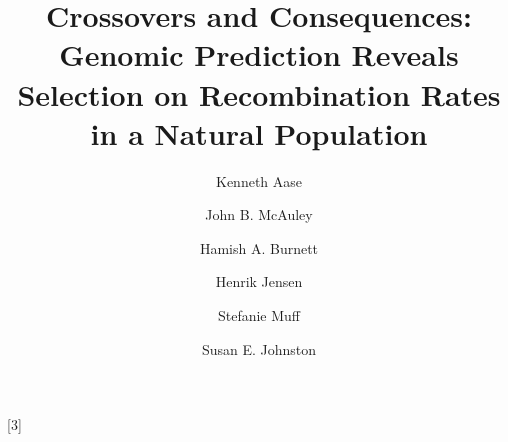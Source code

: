 \usepackage[utf8]{inputenc}
\usepackage[english]{babel}
\usepackage[doublespacing]{setspace}
\usepackage[mathlines]{lineno}
\usepackage{minted}
\usepackage{numprint}
\usepackage{csquotes,xpatch}
\usepackage{fancyhdr,lipsum}
\usepackage{amsmath}
\usepackage{amsfonts}
\usepackage[T1]{fontenc}
\usepackage{lmodern}
\usepackage[normalem]{ulem}
\usepackage[color=blue!30!white,textsize=small,textwidth=30mm]{todonotes}
\usepackage[left=2cm,top=2cm,right=3.5cm,bottom=2cm,bindingoffset=0.5cm]{geometry}
\usepackage{bm}
{}

\usepackage{tabularray}
\usepackage{codehigh}
\newcommand{\tinytableTabularrayUnderline}[1]{\underline{#1}}
\newcommand{\tinytableTabularrayStrikeout}[1]{\sout{#1}}
\NewTableCommand{\tinytableDefineColor}[3]{}



\usepackage{authblk}
\title{Crossovers and Consequences: Genomic Prediction Reveals Selection on Recombination Rates in a Natural Population}
\author[1,2,*]{Kenneth Aase}
\author[3]{John B. McAuley}
\author[2,4]{Hamish A. Burnett}
\author[2,4]{Henrik Jensen}
\author[1,2]{Stefanie Muff}
\author[3]{Susan E. Johnston}
\date{}

\renewcommand\rightmark{Short Title here}

\usepackage{natbib}
\newcommand*{\citef}[1]{\footnote{\cite{#1}}}

%

\newcommand{\E}{\mathsf{E}}
\newcommand{\Prob}{\mathsf{P}}
\newcommand{\Var}{\mathsf{Var}}
\newcommand{\Cov}{\mathsf{Cov}}
\newcommand{\Corr}{\mathsf{Corr}}
\newcommand\given[1][]{\:#1\vert\:}
\newcommand{\N}[2]{\mathsf{N}\left(#1, #2\right)}
\newcommand*\diff{\mathop{}\!\mathrm{d}}
\newcommand{\ie}{\emph{i.e.}}
\newcommand{\eg}{\emph{e.g.}}
\newcommand{\Ie}{\emph{I.e.}}
\newcommand{\Eg}{\emph{E.g.}}
\newcommand{\note}[1]{\textcolor{red}{\scriptsize #1}}
\newcommand{\hl}{\textcolor{blue}}

